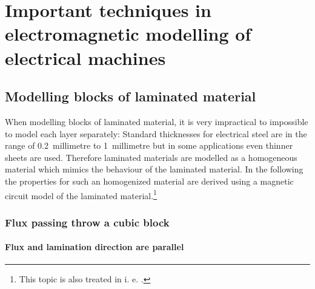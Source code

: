 %
%
%
%
%

\chapter[Important techniques in electromagnetic modelling]{
Important techniques in electromagnetic modelling of electrical
machines}

\label{cha:import-techn-electr}


\section{Modelling blocks of laminated material}
\label{cha:magnetic-resistance}

When modelling blocks of laminated material, it is very impractical to
impossible to model each layer separately: Standard thicknesses for
electrical steel are in the range of 0.2~millimetre to
1~millimetre but in some applications even thinner sheets
are used.  Therefore laminated materials are modelled as a homogeneous
material which mimics the behaviour of the laminated material.  In the
following the properties for such an homogenized material are derived
using a magnetic circuit model of the laminated material.\footnote{This topic
is also treated in i. e. \cite[][Section 7.4]{Salon:1995}.}


\subsection{Flux passing throw a cubic block}

\subsubsection{Flux and lamination direction are parallel}
\label{sec:flux-lamin-direct}

